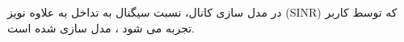    در مدل سازی کانال، نسبت سیگنال به تداخل به علاوه نویز (SINR) که توسط کاربر 
     تجربه می شود ، مدل سازی شده است.

